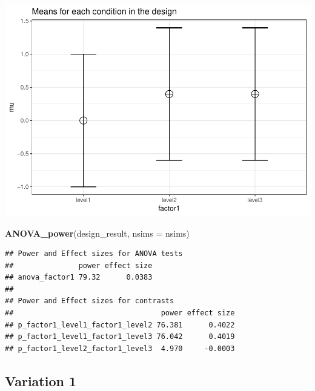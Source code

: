 \documentclass[]{article}
\newenvironment{Shaded}{\begin{snugshade}}{\end{snugshade}}
\newcommand{\KeywordTok}[1]{\textcolor[rgb]{0.13,0.29,0.53}{\textbf{#1}}}
\newcommand{\DataTypeTok}[1]{\textcolor[rgb]{0.13,0.29,0.53}{#1}}
\newcommand{\NormalTok}[1]{#1}
\begin{document}
\includegraphics{1.3_validation_power_between_Brysbaert_1x3_files/figure-latex/unnamed-chunk-4-1.pdf}

\begin{Shaded}
\begin{Highlighting}[]
\KeywordTok{ANOVA_power}\NormalTok{(design_result, }\DataTypeTok{nsims =}\NormalTok{ nsims)}
\end{Highlighting}
\end{Shaded}

\begin{verbatim}
## Power and Effect sizes for ANOVA tests
##               power effect size
## anova_factor1 79.32      0.0383
## 
## Power and Effect sizes for contrasts
##                                  power effect size
## p_factor1_level1_factor1_level2 76.381      0.4022
## p_factor1_level1_factor1_level3 76.042      0.4019
## p_factor1_level2_factor1_level3  4.970     -0.0003
\end{verbatim}

\subsection{Variation 1}\label{variation-1}
\end{document}
